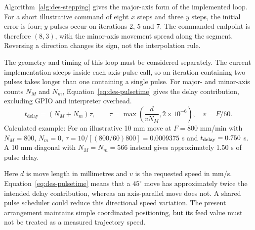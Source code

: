 Algorithm~\ref{alg:des-stepping} gives the major-axis form of the implemented loop. For a short illustrative command of eight $x$ steps and three $y$ steps, the initial error is four; $y$ pulses occur on iterations 2, 5 and 7. The commanded endpoint is therefore $(8,3)$, with the minor-axis movement spread along the segment. Reversing a direction changes its sign, not the interpolation rule.


\begin{designalgorithm}
\caption{Coordinated axis stepping with interruption checks}
\label{alg:des-stepping}
\begin{designpseudo}
\end{designpseudo}
\end{designalgorithm}

The geometry and timing of this loop must be considered separately. The current implementation sleeps inside each axis-pulse call, so an iteration containing two pulses takes longer than one containing a single pulse. For major- and minor-axis counts $N_M$ and $N_m$, Equation~\ref{eq:des-pulsetime} gives the delay contribution, excluding GPIO and interpreter overhead.
\begin{equation}
t_{\mathrm{delay}}=(N_M+N_m)\tau,\qquad
\tau=\max\left(\frac{d}{vN_M},2\times10^{-6}\right),\quad v=F/60.
\label{eq:des-pulsetime}
\end{equation}
Calculated example: For an illustrative 10 mm move at $F=800$ mm/min with $N_M=800$, $N_m=0$, $\tau=10/[(800/60)800]=0.0009375$ s and $t_{\rm delay}=0.750$ s. A 10 mm diagonal with $N_M=N_m=566$ instead gives approximately 1.50 s of pulse delay.

Here $d$ is move length in millimetres and $v$ is the requested speed in mm/s. Equation~\ref{eq:des-pulsetime} means that a $45^\circ$ move has approximately twice the intended delay contribution, whereas an axis-parallel move does not. A shared pulse scheduler could reduce this directional speed variation. The present arrangement maintains simple coordinated positioning, but its feed value must not be treated as a measured trajectory speed.

